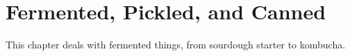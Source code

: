 \chapter{Fermented, Pickled, and Canned}
\label{fermentedPickledAndCanned}
This chapter deals with fermented things, from sourdough starter to kombucha.
\clearpage

%
%
%
%